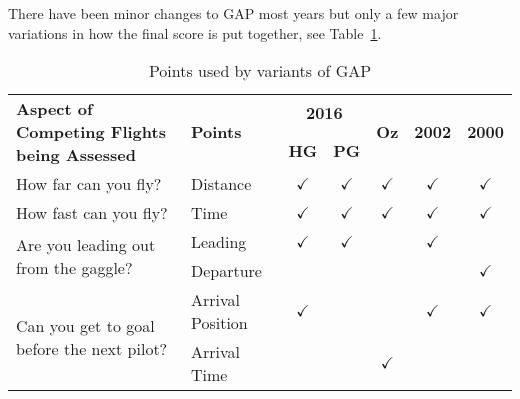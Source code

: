 \documentclass[gap.tex]{subfiles}
\begin{document}
There have been minor changes to GAP most years but only a few major variations
in how the final score is put together, see Table~\ref{tab:gap-variants}.
\begin{table}[!ht]
    \begin{tabularx}{\textwidth}{|X|l|c|c|c|c|c|}
    \hline
         \multirow{2}{*}{\textbf{Aspect of Competing Flights being Assessed}}
         & \multirow{2}{*}{\textbf{Points}}
         & \multicolumn{2}{c|}{\textbf{2016}}
         & \multirow{2}{*}{\textbf{Oz}}
         & \multirow{2}{*}{\textbf{2002}}
         & \multirow{2}{*}{\textbf{2000}}
         \\
    \cline{3-4}
         &
         & \textbf{HG}
         & \textbf{PG}
         &
         &
         &
         \\
    \hline
        How far can you fly?
        & Distance
        & $\checkmark$
        & $\checkmark$
        & $\checkmark$
        & $\checkmark$
        & $\checkmark$
        \\
    \hline
        How fast can you fly?
        & Time
        & $\checkmark$
        & $\checkmark$
        & $\checkmark$
        & $\checkmark$
        & $\checkmark$
        \\
    \hline
        \multirow{2}{*}{Are you leading out from the gaggle?}
        & Leading
        & $\checkmark$
        & $\checkmark$
        &
        & $\checkmark$
        &
        \\
    \cline{2-7}
        & Departure
        &
        &
        &
        &
        & $\checkmark$
        \\
    \hline
        \multirow{2}{*}{Can you get to goal before the next pilot?}
        & Arrival Position
        & $\checkmark$
        &
        &
        & $\checkmark$
        & $\checkmark$
        \\
    \cline{2-7}
        & Arrival Time
        &
        &
        & $\checkmark$
        &
        &
        \\
    \hline
    \end{tabularx}
    \caption{Points used by variants of GAP}
    \label{tab:gap-variants}
\end{table}
\end{document}
